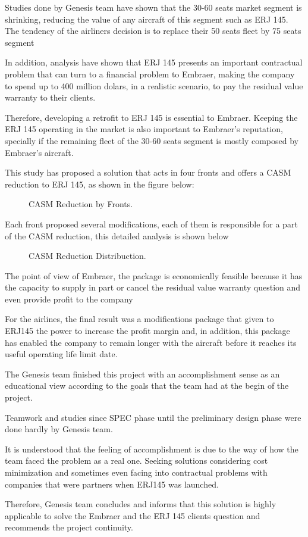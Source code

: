 Studies done by Genesis team have shown that the 30-60 seats market segment is shrinking, reducing the value of any aircraft of this segment such as ERJ 145.
The tendency of the airliners decision is to replace their 50 seats fleet by 75 seats segment

In addition, analysis have shown that ERJ 145 presents an important contractual problem that can turn to a financial problem to Embraer, making the company to spend up to 400 million dolars, in a realistic scenario, to pay the residual value warranty to their clients.

Therefore, developing a retrofit to ERJ 145 is essential to Embraer. Keeping the ERJ 145 operating in the market is also important to Embraer's reputation, specially if the remaining fleet of the 30-60 seats segment is mostly composed by Embraer's aircraft.

This study has proposed a solution that acts in four fronts and offers a CASM reduction to ERJ 145, as shown in the figure below:

\begin{figure}[H] %
\caption{CASM Reduction by Fronts.}
\label{fig:GraphCASMReductionbyFronts}
\end{figure}


Each front proposed several modifications, each of them is responsible for a part of the CASM reduction, this detailed analysis is shown below

\begin{figure}[H] %
\caption{CASM Reduction Distribuction.}
\label{fig:GraphCASMReductionDistribution}
\end{figure}


The point of view of Embraer, the package is economically feasible because it has the capacity to supply in part or cancel the residual value warranty question and even provide profit to the company

For the airlines, the final result was a modifications package that given to ERJ145 the power to increase the profit margin and, in addition, this package has enabled the company to remain longer with the aircraft before it reaches its useful operating life limit date.

The Genesis team finished this project with an accomplishment sense as an educational view according to the goals that the team had at the begin of the project.

Teamwork and studies since SPEC phase until the preliminary design phase were done hardly by Genesis team.

It is understood that the feeling of accomplishment is due to the way of how the team faced the problem as a real one. Seeking solutions considering cost minimization and sometimes even facing into contractual problems
with companies that were partners when ERJ145 was launched.

Therefore, Genesis team concludes and informs that this solution is highly applicable to solve the Embraer and the ERJ 145 clients question and recommends the project continuity.

